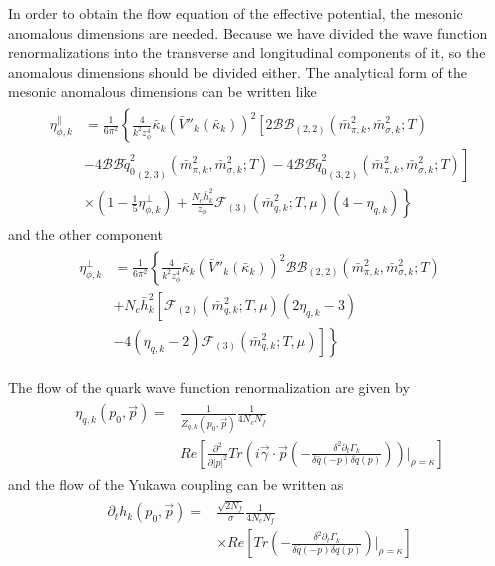 \documentclass[%
reprint,
superscriptaddress,
showpacs,preprintnumbers,
 amsmath,amssymb,
 aps,
prd,
]{revtex4-1}
\begin{document}



In order to obtain the flow equation of the effective potential, the mesonic anomalous dimensions are needed. Because 
we have divided the wave function renormalizations into the transverse and longitudinal components of it, so the 
anomalous dimensions should be divided either.
The analytical form of the mesonic anomalous dimensions can be written like
\begin{align}
\begin{split}
\eta_{\phi,k}^{\|}
&=\frac{1}{6\pi^2}\left\{ 
 \frac{4}{k^2z_\phi^4}\bar{\kappa}_k(\bar{V}''_k(\bar{\kappa}_k))^2\left[ 
 2\mathcal{BB}_{(2,2)}(\bar{m}^{2}_{\pi,k},\bar{m}^{2}_{\sigma,k};T)\right.\right.\\
&\left.\left.-4{\mathcal{BB}\tilde{q}^{2}_{0}}_{(2,3)}(\bar{m}^{2}_{\pi,k},\bar{m}^{2}_{\sigma,k};T)-4{\mathcal{BB}
\tilde{q}^{2}_{0}}_{(3,2)}(\bar{m}^{2}_{\pi,k},\bar{m}^{2}_{\sigma,k};T)\right]\right.\\
&\left.\times(1-\frac{1}{5}\eta^{\bot}_{\phi,k})+\frac{N_c\bar{h}^{2}_{k}}{z_\phi}\mathcal{F}_{(3)}(\bar{m}^{2}_{q,k};T,\mu)(4-\eta_{q,k})
\right\}   
\end{split}
\end{align} 
and the other component
\begin{align}
\begin{split}
\eta_{\phi,k}^{\bot}
&=\frac{1}{6\pi^2}\left\{ 
\frac{4}{k^2z_\phi^4}\bar{\kappa}_k(\bar{V}''_k(\bar{\kappa}_k))^2 \mathcal{BB}_{(2,2)}(\bar{m}^{2}_{\pi,k},\bar{m}^{2}_{\sigma,k};T)
\right.\\&\left.+N_c\bar{h}^{2}_{k}\left[\mathcal{F}_{(2)}(\bar{m}^{2}_{q,k};T,\mu)(2\eta_{q,k}-3)\right.\right.\\
&\left.\left.-4(\eta_{q,k}-2)\mathcal{F}_{(3)}(\bar{m}^2_{q,k};T,\mu)\right]
\right\}   
\end{split}
\end{align} 




The flow of the quark wave function renormalization are given by
\begin{align}
\begin{split}
\eta_{q,k}(p_0,\vec{p})=&\frac{1}{Z_{q,k}(p_0,\vec{p})}\frac{1}{4N_cN_f}\\
&Re\left[\frac{\partial^2}{\partial|p|^2}Tr\left( i\vec{\gamma}\cdot \vec{p}\left( -\frac{\delta^2\partial_t\Gamma_k}
{\delta\bar{q}(-p)\delta q(p)} \right) \right)\bigg|_{\rho=\kappa}\right]
\end{split}
\end{align} 
and the flow of the Yukawa coupling can be written as
\begin{align}
\begin{split}
\partial_th_k(p_0,\vec{p})=&\frac{\sqrt{2N_f}}{\sigma}\frac{1}{4N_cN_f}\\
&\times Re\left[ Tr\left( -\frac{\delta^2\partial_t\Gamma_k}{\delta\bar{q}(-p)\delta q(p)} \right)\bigg|_{\rho=\kappa} \right]
\end{split}
\end{align} 
\end{document}
